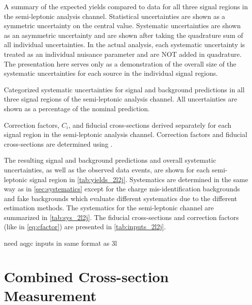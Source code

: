 \begin{table}[ht!]
\centering

\caption{A summary of the expected yields compared to data for all 
three signal regions in the semi-leptonic analysis channel.  
Statistical uncertainties are shown 
as a symmetric uncertainty on the central value. Systematic uncertainties 
are shown as an asymmetric uncertainty and are shown
after taking the quadrature sum of all individual uncertainties. 
In the actual analysis, each systematic uncertainty is
treated as an individual nuisance parameter and are NOT added in quadrature.  
The presentation here serves only as a demonstration
of the overall size of the systematic uncertainties for each source in the 
individual signal regions.}
\label{tab:yields_2l2j}
\end{table}

\begin{table}[ht!]
\centering

\caption{Categorized systematic uncertainties 
for signal and background predictions in all three signal regions
of the semi-leptonic analysis channel.
All uncertainties are shown as a percentage of the nominal
prediction.  }
\label{tab:sys_2l2j}
\end{table}

\begin{table}[ht!]
\centering

\caption{Correction factors, $C_i$, and fiducial cross-sections derived
separately for each signal region in the semi-leptonic analysis channel. 
Correction factors and  fiducial cross-sections are determined
using \madgraph.}
\label{tab:inputs_2l2j}
\end{table}

The resulting signal and background predictions and overall systematic uncertainties,
as well as the observed data events,
are shown for each semi-leptonic signal region in \tab\ref{tab:yields_2l2j}. Systematics
are determined in the same way as in \sec\ref{sec:systematics} except for the charge
mis-identification backgrounds and fake backgrounds which evaluate different systematics due
to the different estimation methods. The systematics for the semi-leptonic
channel are summarized in \tab\ref{tab:sys_2l2j}. The fiducial cross-sections
and correction factors (like in \eqn\eqref{eq:cfactor}) are presented in \tab\ref{tab:inputs_2l2j}.

need aqgc inputs in same format as 3l

\section{Combined Cross-section Measurement}
\label{sec:combined_measurement}


